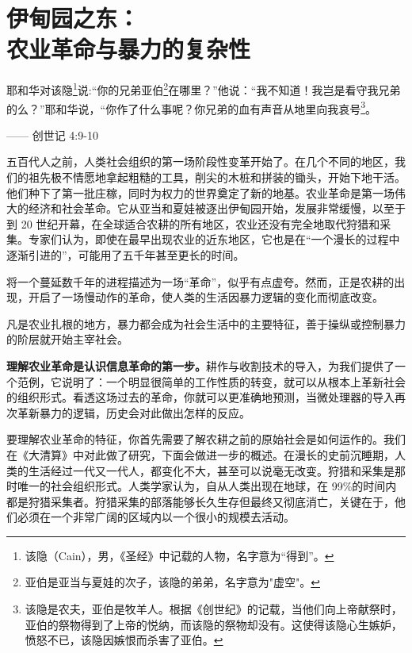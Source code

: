 \chapter[伊甸园之东]{伊甸园之东：\\ 农业革命与暴力的复杂性}

\begin{tcolorbox}
\kaishu 耶和华对该隐\footnote{该隐（Cain），男，《圣经》中记载的人物，名字意为“得到”。}说:“你的兄弟亚伯\footnote{亚伯是亚当与夏娃的次子，该隐的弟弟，名字意为"虚空"。}在哪里？”他说：“我不知道！我岂是看守我兄弟的么？”耶和华说，“你作了什么事呢？你兄弟的血有声音从地里向我哀号\footnote{该隐是农夫，亚伯是牧羊人。根据《创世纪》的记载，当他们向上帝献祭时，亚伯的祭物得到了上帝的悦纳，而该隐的祭物却没有。这使得该隐心生嫉妒，愤怒不已，该隐因嫉恨而杀害了亚伯。}。
\begin{flushright}
—— 创世记 4:9-10 
\end{flushright}
\end{tcolorbox}

五百代人之前，人类社会组织的第一场阶段性变革开始了。在几个不同的地区，我们的祖先极不情愿地拿起粗糙的工具，削尖的木桩和拼装的锄头，开始下地干活。他们种下了第一批庄稼，同时为权力的世界奠定了新的地基。农业革命是第一场伟大的经济和社会革命。它从亚当和夏娃被逐出伊甸园开始，发展非常缓慢，以至于到 20 世纪开幕，在全球适合农耕的所有地区，农业还没有完全地取代狩猎和采集。专家们认为，即使在最早出现农业的近东地区，它也是在“一个漫长的过程中逐渐引进的”，可能用了五千年甚至更长的时间。

将一个蔓延数千年的进程描述为一场“革命”，似乎有点虚夸。然而，正是农耕的出现，开启了一场慢动作的革命，使人类的生活因暴力逻辑的变化而彻底改变。

凡是农业扎根的地方，暴力都会成为社会生活中的主要特征，善于操纵或控制暴力的阶层就开始主宰社会。

\textbf{理解农业革命是认识信息革命的第一步。}耕作与收割技术的导入，为我们提供了一个范例，它说明了：一个明显很简单的工作性质的转变，就可以从根本上革新社会的组织形式。看透这场过去的革命，你就可以更准确地预测，当微处理器的导入再次革新暴力的逻辑，历史会对此做出怎样的反应。

要理解农业革命的特征，你首先需要了解农耕之前的原始社会是如何运作的。我们在《大清算》中对此做了研究，下面会做进一步的概述。在漫长的史前沉睡期，人类的生活经过一代又一代人，都变化不大，甚至可以说毫无改变。狩猎和采集是那时唯一的社会组织形式。人类学家认为，自从人类出现在地球，在 99\%的时间内都是狩猎采集者。狩猎采集的部落能够长久生存但最终又彻底消亡，关键在于，他们必须在一个非常广阔的区域内以一个很小的规模去活动。

